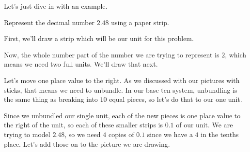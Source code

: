 \documentclass{ximera}
\begin{document}
Let's just dive in with an example.

\begin{example}
Represent the decimal number $2.48$ using a paper strip.


First, we'll draw a strip which will be our unit for this problem.

\begin{center}
\end{center}

Now, the whole number part of the number we are trying to represent is $2$, which means we need two full units. We'll draw that next.

\begin{center}
\end{center}

Let's move one place value to the right. As we discussed with our pictures with sticks, that means we need to unbundle. In our base ten system, unbundling is the same thing as breaking into $10$ equal pieces, so let's do that to our one unit.

\begin{center}
\end{center}

Since we unbundled our single unit, each of the new pieces is one place value to the right of the unit, so each of these smaller strips is $0.1$ of our unit. We are trying to model $2.48$, so we need $4$ copies of $0.1$ since we have a $4$ in the tenths place. Let's add those on to the picture we are drawing.

\begin{center}
\end{center}


\end{example}
\end{document}
